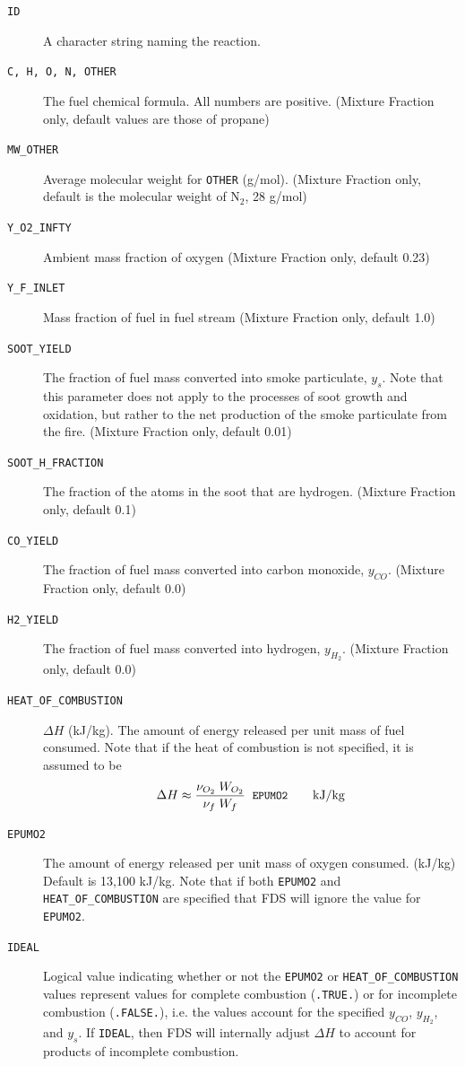 \documentclass[11pt]{book}
\newcommand{\ct}{\tt\small}
\begin{document}
\begin{description}
\item[{\ct ID}] A character string naming the reaction.
\item[{\ct C, H, O, N, OTHER}] The fuel chemical formula. All numbers are positive.
(Mixture Fraction only, default values are those of propane)
\item[{\ct MW\_OTHER}] Average molecular weight for {\ct OTHER} (g/mol).
(Mixture Fraction only, default is the molecular weight of N$_2$, 28 g/mol)
\item[{\ct Y\_O2\_INFTY}] Ambient mass fraction of oxygen (Mixture Fraction only, default 0.23)
\item[{\ct Y\_F\_INLET}] Mass fraction of fuel in fuel stream (Mixture Fraction only, default 1.0)
\item[{\ct SOOT\_YIELD}] The fraction of fuel mass converted into smoke particulate, $y_s$.
Note that this parameter does not apply to the processes of soot growth and oxidation,
but rather to the net production of the smoke particulate from the fire.  (Mixture Fraction only, default 0.01)
\item[{\ct SOOT\_H\_FRACTION}] The fraction of the atoms in the soot that are hydrogen.
(Mixture Fraction only, default 0.1)
\item[{\ct CO\_YIELD}] The fraction of fuel mass converted into carbon
monoxide, $y_{CO}$. (Mixture Fraction only, default 0.0)
\item[{\ct H2\_YIELD}] The fraction of fuel mass converted into hydrogen, $y_{H_2}$. (Mixture Fraction only, default 0.0)
\item[{\ct HEAT\_OF\_COMBUSTION}] $\Delta H$ (kJ/kg). The amount of
energy released per unit mass of fuel consumed. Note that if the heat of combustion is not
specified, it is assumed to be
$$ \Delta H \approx \frac{\nu_{O_2} \; W_{O_2} } { \nu_{f} \; W_{f} } \; \;
   \hbox{\ct EPUMO2}  \quad \quad \hbox{kJ/kg}  $$
\item[{\ct EPUMO2}] The amount of energy released per unit mass of oxygen consumed. (kJ/kg)
Default is 13,100 kJ/kg.  Note that if both {\ct EPUMO2} and {\ct HEAT\_OF\_COMBUSTION} are
specified that FDS will ignore the value for {\ct EPUMO2}.
\item[{\ct IDEAL}] Logical value indicating whether or not the {\ct EPUMO2} or {\ct  HEAT\_OF\_COMBUSTION}
values represent values for complete combustion ({\ct .TRUE.}) or for incomplete combustion ({\ct .FALSE.}),
i.e. the values account for the specified $y_{CO}$, $y_{H_2}$, and $y_s$.  If {\ct IDEAL}, then
FDS will internally adjust $\Delta H$ to account for products of incomplete combustion.
\end{description}
\end{document}
